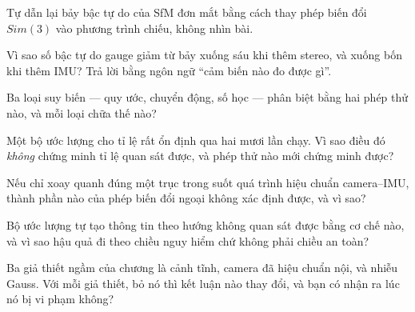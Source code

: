 \documentclass[../../vslam.tex]{subfiles}
\begin{document}
\begin{tukiem}
\item Tự dẫn lại bảy bậc tự do của SfM đơn mắt bằng cách thay phép biến đổi \(Sim(3)\) vào phương trình chiếu, không nhìn bài.
\item Vì sao số bậc tự do gauge giảm từ bảy xuống sáu khi thêm stereo, và xuống bốn khi thêm IMU? Trả lời bằng ngôn ngữ ``cảm biến nào đo được gì''.
\item Ba loại suy biến --- quy ước, chuyển động, số học --- phân biệt bằng hai phép thử nào, và mỗi loại chữa thế nào?
\item Một bộ ước lượng cho tỉ lệ rất ổn định qua hai mươi lần chạy. Vì sao điều đó \emph{không} chứng minh tỉ lệ quan sát được, và phép thử nào mới chứng minh được?
\item Nếu chỉ xoay quanh đúng một trục trong suốt quá trình hiệu chuẩn camera--IMU, thành phần nào của phép biến đổi ngoại không xác định được, và vì sao?
\item Bộ ước lượng tự tạo thông tin theo hướng không quan sát được bằng cơ chế nào, và vì sao hậu quả đi theo chiều nguy hiểm chứ không phải chiều an toàn?
\item Ba giả thiết ngầm của chương là cảnh tĩnh, camera đã hiệu chuẩn nội, và nhiễu Gauss. Với mỗi giả thiết, bỏ nó thì kết luận nào thay đổi, và bạn có nhận ra lúc nó bị vi phạm không?
\end{tukiem}
\ifSubfilesClassLoaded{\printbibliography[title={Nguồn}]}{}
\end{document}

